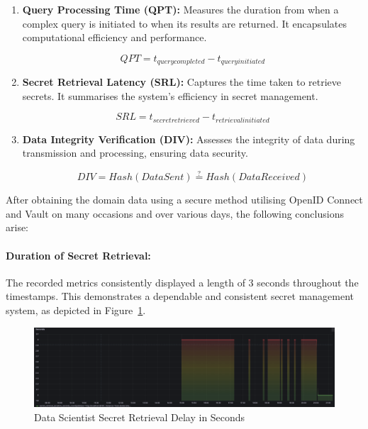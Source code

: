 \documentclass{ieeeaccess}
\begin{document}
\begin{enumerate}

  \item \textbf{Query Processing Time (QPT):} Measures the duration from when a complex query is initiated to when its results are returned. It encapsulates computational efficiency and performance.

  \begin{equation}
      QPT = t_{query completed} - t_{query initiated}
  \end{equation}

  \item \textbf{Secret Retrieval Latency (SRL):} Captures the time taken to retrieve secrets. It summarises the system's efficiency in secret management.

  \begin{equation}
      SRL = t_{secret retrieved} - t_{retrieval initiated}
  \end{equation}

  \item \textbf{Data Integrity Verification (DIV):} Assesses the integrity of data during transmission and processing, ensuring data security.

  \begin{equation}
      DIV = Hash(Data Sent) \stackrel{?}{=} Hash(Data Received)
  \end{equation}

\end{enumerate}

After obtaining the domain data using a secure method utilising OpenID Connect and Vault on many occasions and over various days, the following conclusions arise:

\paragraph{Duration of Secret Retrieval:}

The recorded metrics consistently displayed a length of 3 seconds throughout the timestamps. This demonstrates a dependable and consistent secret management system, as depicted in Figure~\ref{dataScientistSecretRetrievalDelayInSeconds}.

\begin{figure}[h]

  \centering

  \includegraphics[width=\textwidth]{images/Secret-Retrieval-Delay-in-Seconds-In-Data-Scientist-Application.png}

  \caption{Data Scientist Secret Retrieval Delay in Seconds }

  \label{dataScientistSecretRetrievalDelayInSeconds}

\end{figure}
\end{document}
